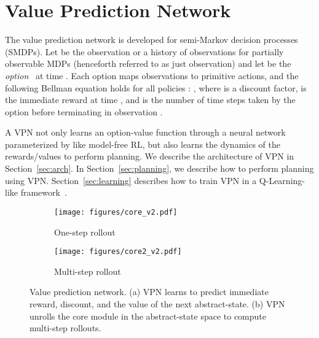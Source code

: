 \documentclass{article}
\newcommand{\cutsectiondown}{\vspace*{-0.03in}}
\newcommand{\cutsubsectionup}{\vspace*{-0.04in}}
\begin{document}
\section{Value Prediction Network}
\cutsectiondown
The value prediction network is developed for semi-Markov decision processes (SMDPs). Let  be the observation or a history of observations for partially observable MDPs (henceforth referred to as just observation) and let  be the  \textit{option}~\citep{sutton1999between,Stolle2002LearningOI,precup2000temporal} at time . Each option maps 
observations to primitive actions, and the following Bellman equation holds for all policies : , 
where  is a discount factor,  is the immediate reward at time , and  is the number of time steps taken by the option  before terminating in observation .


A VPN not only learns an option-value function  through a neural network parameterized by  like model-free RL, but also learns the dynamics of the rewards/values to perform planning. We describe the architecture of VPN in Section~\ref{sec:arch}. In Section~\ref{sec:planning}, we describe how to perform planning using VPN. Section~\ref{sec:learning} describes how to train VPN in a Q-Learning-like framework~\cite{watkins1992q}.

\begin{figure}
    \centering
    \begin{subfigure}{0.43\linewidth}
    		\centering
\texttt{[image: figures/core\_v2.pdf]} 
	    \vspace{-5pt}
	    \caption{One-step rollout}
	    \label{fig:1-step}
   	\end{subfigure}
   	\hspace{0.3in}
   	\begin{subfigure}{0.43\linewidth}
    		\centering
	    \texttt{[image: figures/core2\_v2.pdf]}
\vspace{-5pt}
	    \caption{Multi-step rollout}
	    \label{fig:n-step}
   	\end{subfigure}
   	\vspace{-5pt}
	\caption{Value prediction network. (a) VPN learns to predict immediate reward, discount, and the value of the next abstract-state. (b) VPN unrolls the core module in the abstract-state space to compute multi-step rollouts. } 
	\vspace{-10pt}
	\label{fig:arch}
\end{figure}



\cutsubsectionup
\end{document}
